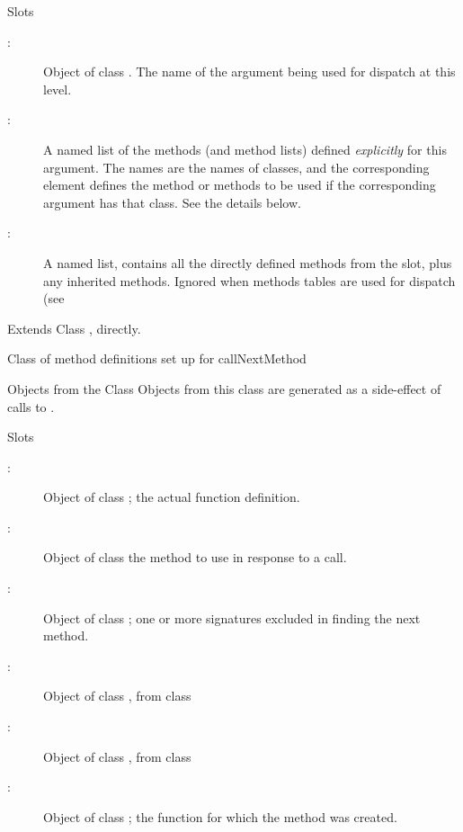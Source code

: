 %
\begin{Section}{Slots}
\begin{description}


\item[:] Object of class .  The name of the
argument being used for dispatch at this level. 
\item[:] A named list of the methods (and method lists)
defined \emph{explicitly} for this argument. 
The names are the names of classes, and the corresponding
element defines the method or methods to be used if the corresponding
argument has that class.  See the details below.
\item[:] A named list,  contains
all the directly defined methods from the  slot, plus
any inherited methods.  Ignored when methods tables are used for dispatch (see  

\end{description}
\end{Section}
%
\begin{Section}{Extends}
Class , directly.
\end{Section}
%
\begin{Description}\relax
 Class of method definitions set up for callNextMethod 
\end{Description}
%
\begin{Section}{Objects from the Class}
Objects from this class are generated as a side-effect of calls to
.
\end{Section}
%
\begin{Section}{Slots}
\begin{description}

\item[:] Object of class ; the actual
function definition.
\item[:] Object of class 
the method to use in response to a 
call.
\item[:] Object of class ; one or more
signatures excluded in finding the next method. 
\item[:] Object of class , from class
\item[:] Object of class , from
class 
\item[:] Object of class ; the function
for which the method was created. 

\end{description}

\end{Section}
